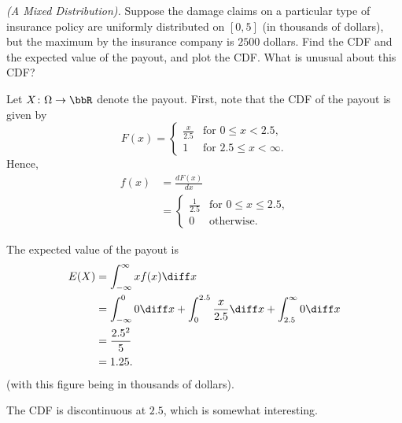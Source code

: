 \begin{problem}[Handout 12, \# 18]
  \emph{(A Mixed Distribution).} Suppose the damage claims on a particular
  type of insurance policy are uniformly distributed on \([0,5]\) (in
  thousands of dollars), but the maximum by the insurance company is
  \(2500\) dollars. Find the CDF and the expected value of the payout, and
  plot the CDF. What is unusual about this CDF?
\end{problem}
\begin{solution}
  Let \(X\colon\Omega\to\bbR\) denote the payout. First, note that the CDF
  of the payout is given by
  \[
    F(x) =
    \begin{cases}
      \frac{x}{2.5}&\text{for \(0\leq x<2.5\),}\\
      1&\text{for \(2.5\leq x<\infty\).}
    \end{cases}
  \]
  Hence,
  \begin{align*}
    f(x)
    &=\frac{dF(x)}{dx}\\
    &=\begin{cases}
      \frac{1}{2.5}&\text{for \(0\leq x\leq 2.5\),}\\
      0&\text{otherwise.}
    \end{cases}
  \end{align*}

  The expected value of the payout is
  \begin{align*}
    E(X)
    &=\int_{-\infty}^\infty xf(x) \diff x\\
    &=\int_{-\infty}^0 0\diff x%
      +\int_0^{2.5}\frac{x}{2.5} \diff x%
      +\int_{2.5}^\infty 0\diff x\\
    &=\frac{2.5^2}{5}\\
    &=1.25.
  \end{align*}
  (with this figure being in thousands of dollars).

  The CDF is discontinuous at $2.5$, which is somewhat interesting.
\end{solution}
\newpage

